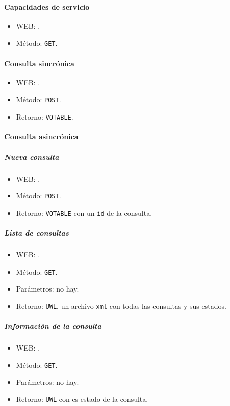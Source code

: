 \paragraph{Capacidades de servicio}

\begin{itemize}
	\item WEB: \url{}.
	\item M\'etodo: \verb;GET;.
\end{itemize}

\paragraph{Consulta sincrónica}

\begin{itemize}
	\item WEB: \url{}.
	\item M\'etodo: \verb;POST;.
	\item Retorno: \verb;VOTABLE;.
\end{itemize}

\paragraph{Consulta asincrónica}

\subparagraph{Nueva consulta}

\begin{itemize}
	\item WEB: \url{}.
	\item M\'etodo: \verb;POST;.
	\item Retorno: \verb;VOTABLE; con un \verb;id; de la consulta.
\end{itemize}

\subparagraph{Lista de consultas}

\begin{itemize}
	\item WEB: \url{}.
	\item M\'etodo: \verb;GET;.
	\item Parámetros: no hay.
	\item Retorno: \verb;UWL;, un archivo \verb;xml; con todas las consultas y sus estados.
\end{itemize}

\subparagraph{Información de la consulta}

\begin{itemize}
	\item WEB: \url{}.
	\item M\'etodo: \verb;GET;.
	\item Parámetros: no hay.
	\item Retorno: \verb;UWL; con es estado de la consulta.
\end{itemize}

